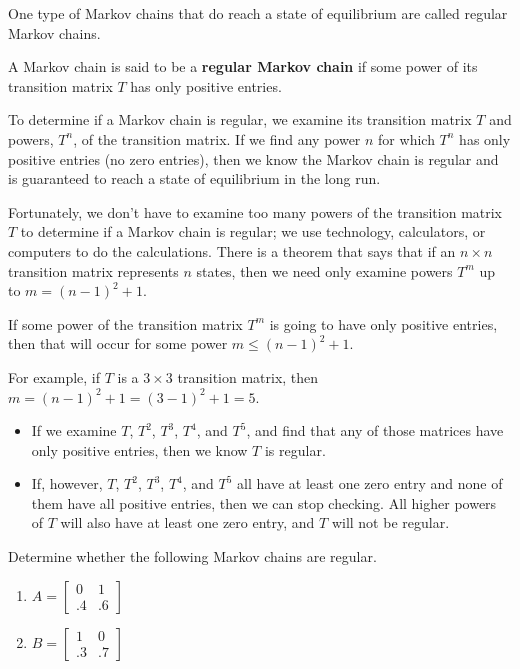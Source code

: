 One type of Markov chains that do reach a state of equilibrium are called regular Markov chains.
\begin{definition}
    A Markov chain is said to be a \textbf{regular Markov chain} if some power of its transition matrix \( T \) has only positive entries.
\end{definition}

To determine if a Markov chain is regular, we examine its transition matrix \( T \) and powers, \( T^n \), of the transition matrix. If we find any power \( n \) for which \( T^n \) has only positive entries (no zero entries), then we know the Markov chain is regular and is guaranteed to reach a state of equilibrium in the long run.

Fortunately, we don't have to examine too many powers of the transition matrix \( T \) to determine if a Markov chain is regular; we use technology, calculators, or computers to do the calculations. There is a theorem that says that if an \( n \times n \) transition matrix represents \( n \) states, then we need only examine powers \( T^m \) up to \( m = (n-1)^2 + 1 \).

If some power of the transition matrix \( T^m \) is going to have only positive entries, then that will occur for some power \( m \leq (n-1)^2 + 1 \).

For example, if \( T \) is a \( 3 \times 3 \) transition matrix, then \( m = (n-1)^2 + 1 = (3-1)^2 + 1 = 5 \).

\begin{itemize}
    \item If we examine \( T \), \( T^2 \), \( T^3 \), \( T^4 \), and \( T^5 \), and find that any of those matrices have only positive entries, then we know \( T \) is regular.
    \item If, however, \( T \), \( T^2 \), \( T^3 \), \( T^4 \), and \( T^5 \) all have at least one zero entry and none of them have all positive entries, then we can stop checking. All higher powers of \( T \) will also have at least one zero entry, and \( T \) will not be regular.
\end{itemize}

\begin{example}
    Determine whether the following Markov chains are regular.

    \begin{enumerate}
        \item \( A = \begin{bmatrix}
                  0  & 1  \\
                  .4 & .6
              \end{bmatrix} \)

        \item \( B = \begin{bmatrix}
                  1  & 0  \\
                  .3 & .7
              \end{bmatrix} \)
    \end{enumerate}
\end{example}

